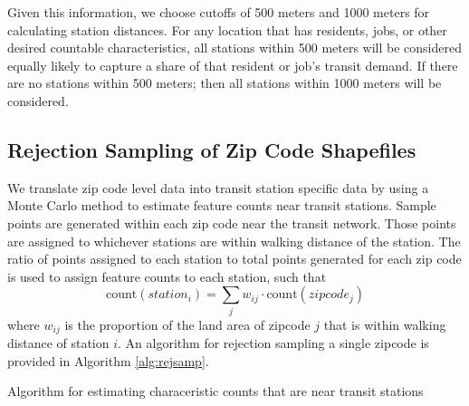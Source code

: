 \documentclass[11pt]{article}
\begin{document}
Given this information, we choose cutoffs of 500 meters and 1000 meters for calculating station distances. For any location that has residents, jobs, or other desired countable characteristics, all stations within 500 meters will be considered equally likely to capture a share of that resident or job's transit demand. If there are no stations within 500 meters; then all stations within 1000 meters will be considered. 

\subsection{Rejection Sampling of Zip Code Shapefiles}\label{sec:sampling}

We translate zip code level data into transit station specific data by using a Monte Carlo method to estimate feature counts near transit stations. Sample points are generated within each zip code near the transit network. Those points are assigned to whichever stations are within walking distance of the station. The ratio of points assigned to each station to total points generated for each zip code is used to assign feature counts to each station, such that
\[\text{count}(station_i) = \sum_j w_{ij} \cdot \text{count}(zipcode_j)\]
where $w_{ij}$ is the proportion of the land area of zipcode $j$ that is within walking distance of station $i$. An algorithm for rejection sampling a single zipcode is provided in Algorithm \ref{alg:rejsamp}.


\begin{algorithm}\begingroup\fontsize{10}{10}\selectfont
\begin{algorithmic}
	\EndIf
\EndWhile
{}
		\EndFor
		\EndFor
	\EndIf
\EndFor
\end{algorithmic}\endgroup\caption{Algorithm for estimating characeristic counts that are near transit stations}\label{alg:rejsamp}
\end{algorithm}
\end{document}
